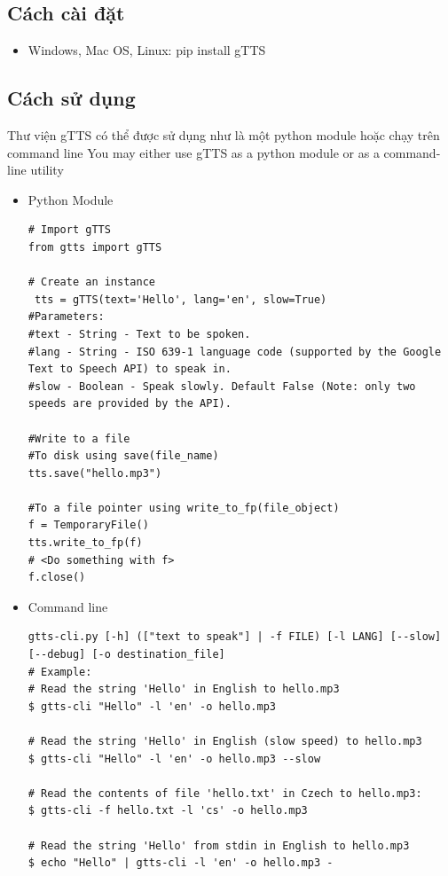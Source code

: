 \subsection{Cách cài đặt}
\begin{itemize}
\item Windows, Mac OS, Linux: pip install gTTS
\end{itemize}

\subsection{Cách sử dụng}
Thư viện gTTS có thể được sử dụng như là một python module hoặc chạy trên command line
You may either use gTTS as a python module or as a command-line utility
\begin{itemize}
\item Python Module
\begin{lstlisting}
# Import gTTS
from gtts import gTTS

# Create an instance
 tts = gTTS(text='Hello', lang='en', slow=True)
#Parameters:
#text - String - Text to be spoken.
#lang - String - ISO 639-1 language code (supported by the Google Text to Speech API) to speak in.
#slow - Boolean - Speak slowly. Default False (Note: only two speeds are provided by the API).

#Write to a file
#To disk using save(file_name)
tts.save("hello.mp3")

#To a file pointer using write_to_fp(file_object)
f = TemporaryFile()
tts.write_to_fp(f)
# <Do something with f>
f.close()
\end{lstlisting}
\item Command line
\begin{lstlisting}
gtts-cli.py [-h] (["text to speak"] | -f FILE) [-l LANG] [--slow] [--debug] [-o destination_file]
# Example:
# Read the string 'Hello' in English to hello.mp3
$ gtts-cli "Hello" -l 'en' -o hello.mp3

# Read the string 'Hello' in English (slow speed) to hello.mp3
$ gtts-cli "Hello" -l 'en' -o hello.mp3 --slow

# Read the contents of file 'hello.txt' in Czech to hello.mp3:
$ gtts-cli -f hello.txt -l 'cs' -o hello.mp3

# Read the string 'Hello' from stdin in English to hello.mp3
$ echo "Hello" | gtts-cli -l 'en' -o hello.mp3 -
\end{lstlisting}
\end{itemize}

